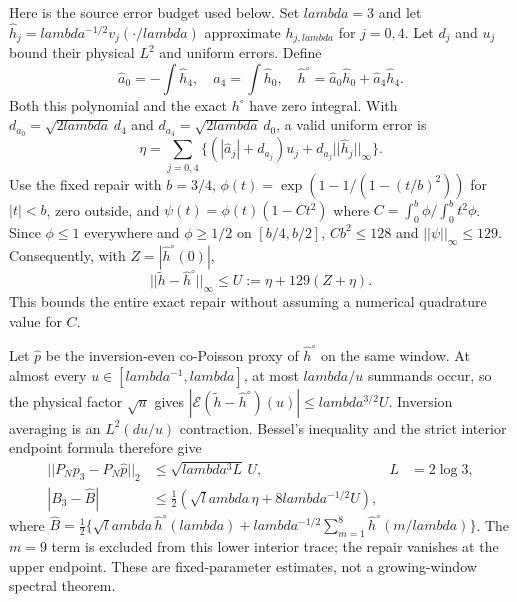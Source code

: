 \documentclass[11pt]{article}
\def\lambda{lambda}%
\def\norm#1{||#1||}%
\theoremstyle{remark}
\newcommand{\norm}[1]{\left\lVert #1\right\rVert}
\begin{document}
Here is the source error budget used below. Set $\lambda=3$ and let
$\widehat h_j=\lambda^{-1/2}v_j(\cdot/\lambda)$ approximate
$h_{j,\lambda}$ for $j=0,4$. Let $d_j$ and $u_j$ bound their physical
$L^2$ and uniform errors. Define
\[
 \widehat a_0=-\int\widehat h_4,\quad
 \widehat a_4=\int\widehat h_0,\quad
 \widehat h^\circ=\widehat a_0\widehat h_0+
                  \widehat a_4\widehat h_4.
\]
Both this polynomial and the exact $h^\circ$ have zero integral.
With $d_{a_0}=\sqrt{2\lambda}\,d_4$ and
$d_{a_4}=\sqrt{2\lambda}\,d_0$, a valid uniform error is
\begin{equation}\label{eq:v113-source-budget}
 \eta=\sum_{j=0,4}
 \{(|\widehat a_j|+d_{a_j})u_j+
                d_{a_j}\norm{\widehat h_j}_\infty\}.
\end{equation}
Use the fixed repair with $b=3/4$,
$\phi(t)=\exp(1-1/(1-(t/b)^2))$ for $|t|<b$, zero outside, and
$\psi(t)=\phi(t)(1-Ct^2)$ where
$C=\int_0^b\phi/\int_0^b t^2\phi$.
Since $\phi\le1$ everywhere and $\phi\ge1/2$ on $[b/4,b/2]$,
$Cb^2\le128$ and $\norm\psi_\infty\le129$.
Consequently, with $Z=|\widehat h^\circ(0)|$,
\begin{equation}\label{eq:v113-repair-budget}
 \norm{\widetilde h-\widehat h^\circ}_\infty
 \le U:=\eta+129(Z+\eta).
\end{equation}
This bounds the entire exact repair without assuming a numerical
quadrature value for $C$.

Let $\widehat p$ be the inversion-even co-Poisson proxy of
$\widehat h^\circ$ on the same window. At almost every
$u\in[\lambda^{-1},\lambda]$, at most $\lambda/u$ summands occur,
so the physical factor $\sqrt u$ gives
$|\mathcal E(\widetilde h-\widehat h^\circ)(u)|
 \le\lambda^{3/2}U$.
Inversion averaging is an $L^2(du/u)$ contraction. Bessel's inequality
and the strict interior endpoint formula therefore give
\begin{align}
 \norm{P_Np_3-P_N\widehat p}_2&\le\sqrt{\lambda^3L}\,U,
       &L&=2\log3,\label{eq:v113-projection-budget}\\
 |B_3-\widehat B|&\le\tfrac12\left(\sqrt\lambda\,\eta+
                                     8\lambda^{-1/2}U\right),
 \label{eq:v113-endpoint-budget}
\end{align}
where
$\widehat B=\tfrac12\{\sqrt\lambda\,\widehat h^\circ(\lambda)
+\lambda^{-1/2}\sum_{m=1}^{8}\widehat h^\circ(m/\lambda)\}$.
The $m=9$ term is excluded from this lower interior trace; the repair
vanishes at the upper endpoint. These are fixed-parameter estimates,
not a growing-window spectral theorem.
\end{document}
